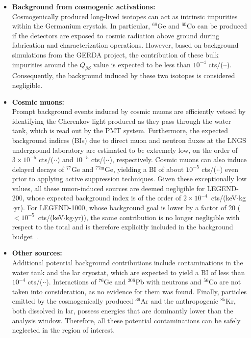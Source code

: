 \begin{itemize}
\item \textbf{Background from cosmogenic activations:}\\
            Cosmogenically produced long-lived isotopes can act as intrinsic impurities within the Germanium crystals. In particular, ${}^{68}$Ge and ${}^{60}$Co can be produced if the detectors are exposed to cosmic radiation above ground during fabrication and characterization operations. However, based on background simulations from the GERDA project, the contribution of these bulk impurities around the $Q_{\beta\beta}$ value is expected to be less than $10^{-4}$ cts/($\cdot$$\cdot$). Consequently, the background induced by these two isotopes is considered negligible.

    \item \textbf{Cosmic muons:}\\
            Prompt background events induced by cosmic muons are efficiently vetoed by identifying the Cherenkov light produced as they pass through the water tank, which is read out by the \ac{PMT} system. Furthermore, the expected background indices (BIs) due to direct muon and neutron fluxes at the LNGS underground laboratory are estimated to be extremely low, on the order of $3 \times 10^{-5}$ cts/($\cdot$$\cdot$) and $10^{-5}$ cts/($\cdot$$\cdot$), respectively. Cosmic muons can also induce delayed decays of ${}^{77}$Ge and ${}^{77\text{m}}$Ge, yielding a BI of about $10^{-5}$ cts/($\cdot$$\cdot$) even prior to applying active suppression techniques. Given these exceptionally low values, all these muon-induced sources are deemed negligible for LEGEND-200, whose expected background index is of the order of $2\times10^{-4}$~cts/(keV$\cdot$kg$\cdot$yr). For LEGEND-1000, whose background goal is lower by a factor of 20 ($<10^{-5}$~cts/(keV$\cdot$kg$\cdot$yr)), the same contribution is no longer negligible with respect to the total and is therefore explicitly included in the background budget~\cite{L1000-design}.
            
    \item \textbf{Other sources:}\\
            Additional potential background contributions include contaminations in the water tank and the \ac{lar} cryostat, which are expected to yield a BI of less than $10^{-4}$ cts/($\cdot$$\cdot$). Interactions of ${}^{76}$Ge and ${}^{206}$Pb with neutrons and ${}^{56}$Co are not taken into consideration, as no evidence for them was found. Finally, particles emitted by the cosmogenically produced ${}^{39}$Ar and the anthropogenic ${}^{85}$Kr, both dissolved in \ac{lar}, possess energies that are dominantly lower than the analysis window. Therefore, all these potential contaminations can be safely neglected in the region of interest.

\end{itemize}

